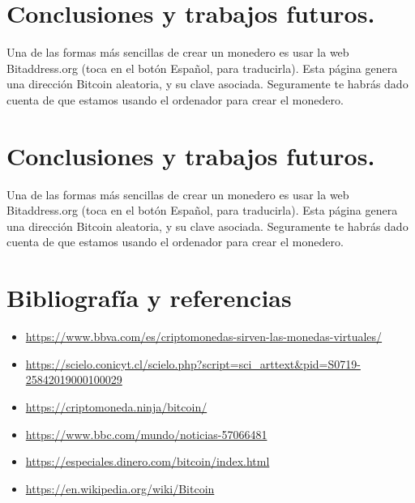 \documentclass[10pt,twocolumn]{article}
\theoremstyle{definition}
\begin{document}
\section{Conclusiones y trabajos futuros.}
Una de las formas más sencillas de crear un monedero es usar la web Bitaddress.org (toca en el botón Español, para traducirla). Esta página genera una dirección Bitcoin aleatoria, y su clave asociada. Seguramente te habrás dado cuenta de que estamos usando el ordenador para crear el monedero.

\section{Conclusiones y trabajos futuros.}
Una de las formas más sencillas de crear un monedero es usar la web Bitaddress.org (toca en el botón Español, para traducirla). Esta página genera una dirección Bitcoin aleatoria, y su clave asociada. Seguramente te habrás dado cuenta de que estamos usando el ordenador para crear el monedero.



\newpage
\section{Bibliografía y referencias}

\begin{itemize}
    \item \url{https://www.bbva.com/es/criptomonedas-sirven-las-monedas-virtuales/}
    \item \url{https://scielo.conicyt.cl/scielo.php?script=sci_arttext&pid=S0719-25842019000100029}
    \item \url{https://criptomoneda.ninja/bitcoin/}
    \item \url{https://www.bbc.com/mundo/noticias-57066481}
    \item \url{https://especiales.dinero.com/bitcoin/index.html}
    \item \url{https://en.wikipedia.org/wiki/Bitcoin}
\end{itemize}
\end{document}
